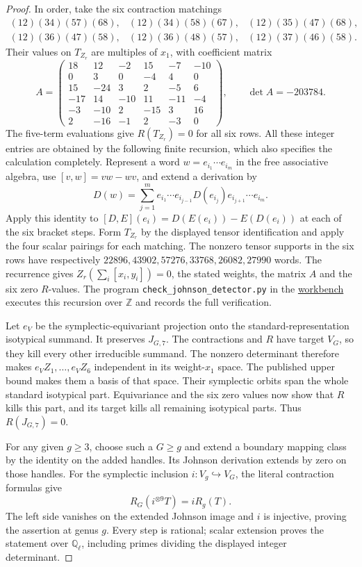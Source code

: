 \begin{proof}
In order, take the six contraction matchings
\[
\begin{array}{lll}
(12)(34)(57)(68),&(12)(34)(58)(67),&(12)(35)(47)(68),\\
(12)(36)(47)(58),&(12)(36)(48)(57),&(12)(37)(46)(58).
\end{array}
\]
Their values on $T_{Z_r}$ are multiples of $x_1$, with coefficient
matrix
\[
 A=\begin{pmatrix}
18&12&-2&15&-7&-10\\
0&3&0&-4&4&0\\
15&-24&3&2&-5&6\\
-17&14&-10&11&-11&-4\\
-3&-10&2&-15&3&16\\
2&-16&-1&2&-3&0
\end{pmatrix},\qquad \det A=-203784.
\]
The five-term evaluations give $R(T_{Z_r})=0$ for all six rows.
All these integer entries are obtained by the following finite
recursion, which also specifies the calculation completely.
Represent a word $w=e_{i_1}\cdots e_{i_m}$ in the free associative
algebra, use $[v,w]=vw-wv$, and extend a derivation by
\[
 D(w)=\sum_{j=1}^m e_{i_1}\cdots e_{i_{j-1}}
                    D(e_{i_j})e_{i_{j+1}}\cdots e_{i_m}.
\]
Apply this identity to $[D,E](e_i)=D(E(e_i))-E(D(e_i))$ at each
of the six bracket steps. Form $T_{Z_r}$ by the displayed tensor
identification and apply the four scalar pairings for each matching.
The nonzero tensor supports in the six rows have respectively
$22896,43902,57276,33768,26082,27990$ words. The recurrence gives
$Z_r(\sum_i[x_i,y_i])=0$, the stated weights, the matrix $A$ and
the six zero $R$-values. The program \texttt{check\_johnson\_detector.py}
in the \href{\workbenchurl}{workbench} executes this recursion over
$\mathbb Z$ and records the full verification.

Let $e_V$ be the symplectic-equivariant projection onto the
standard-representation isotypical summand. It preserves $J_{G,7}$.
The contractions and $R$ have target $V_G$, so they kill every other
irreducible summand. The nonzero determinant therefore makes
$e_VZ_1,\ldots,e_VZ_6$ independent in its weight-$x_1$ space.
The published upper bound makes them a basis of that space.
Their symplectic orbits span the whole standard isotypical part.
Equivariance and the six zero values now show that $R$ kills this
part, and its target kills all remaining isotypical parts.
Thus $R(J_{G,7})=0$.

For any given $g\geq3$, choose such a $G\geq g$ and extend a
boundary mapping class by the identity on the added handles.
Its Johnson derivation extends by zero on those handles.
For the symplectic inclusion $i:V_g\hookrightarrow V_G$, the
literal contraction formulas give
\[
 R_G(i^{\otimes9}T)=iR_g(T).
\]
The left side vanishes on the extended Johnson image and $i$ is
injective, proving the assertion at genus $g$. Every step is rational;
scalar extension proves the statement over $\mathbb Q_\ell$, including
primes dividing the displayed integer determinant.
\end{proof}
